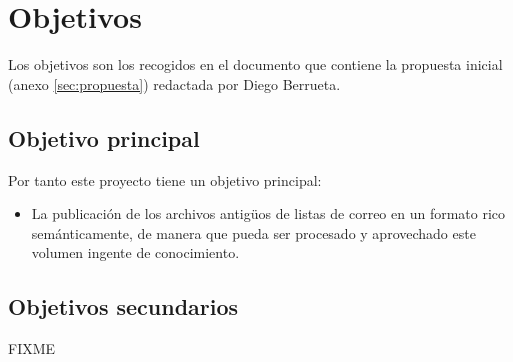 
\section{Objetivos}

Los objetivos son los recogidos en el documento que contiene la propuesta 
inicial (anexo \ref{sec:propuesta}) redactada por Diego Berrueta.

\subsection{Objetivo principal}

Por tanto este proyecto tiene un objetivo principal:

\begin{itemize}
  \item La publicación de los archivos antigüos de listas de correo en un 
	formato rico semánticamente, de manera que pueda ser procesado y
	aprovechado este volumen ingente de conocimiento.
\end{itemize}

\subsection{Objetivos secundarios}

FIXME
